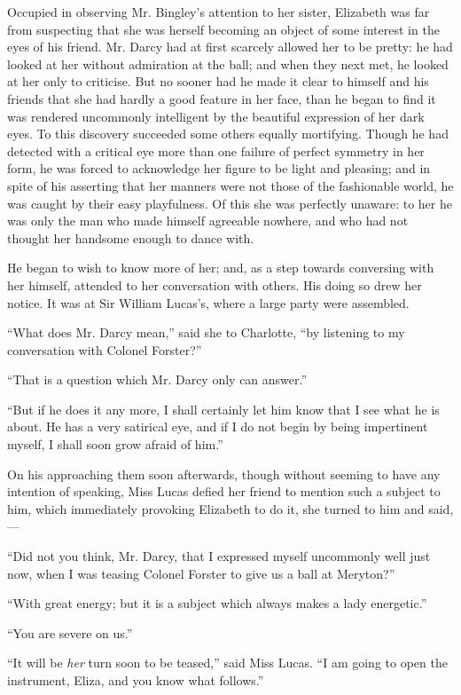 Occupied in observing Mr. Bingley's attention to her sister, Elizabeth was far from suspecting that she was herself becoming an object of some interest in the eyes of his friend. Mr. Darcy had at first scarcely allowed her to be pretty: he had looked at her without admiration at the ball; and when they next met, he looked at her only to criticise. But no sooner had he made it clear to himself and his friends that she had hardly a good feature in her face, than he began to find it was rendered uncommonly intelligent by the beautiful expression of her dark eyes. To this discovery succeeded some others equally mortifying. Though he had detected with a critical eye more than one failure of perfect symmetry in her form, he was forced to acknowledge her figure to be light and pleasing; and in spite of his asserting that her manners were not those of the fashionable world, he was caught by their easy playfulness. Of this she was perfectly unaware: to her he was only the man who made himself agreeable nowhere, and who had not thought her handsome enough to dance with.

He began to wish to know more of her; and, as a step towards conversing with her himself, attended to her conversation with others. His doing so drew her notice. It was at Sir William Lucas's, where a large party were assembled.

``What does Mr. Darcy mean,'' said she to Charlotte, ``by listening to my conversation with Colonel Forster?''

``That is a question which Mr. Darcy only can answer.''

``But if he does it any more, I shall certainly let him know that I see what he is about. He has a very satirical eye, and if I do not begin by being impertinent myself, I shall soon grow afraid of him.''

On his approaching them soon afterwards, though without seeming to have any intention of speaking, Miss Lucas defied her friend to mention such a subject to him, which immediately provoking Elizabeth to do it, she turned to him and said,---

``Did not you think, Mr. Darcy, that I expressed myself uncommonly well just now, when I was teasing Colonel Forster to give us a ball at Meryton?''

``With great energy; but it is a subject which always makes a lady energetic.''

``You are severe on us.''

``It will be \textit{her} turn soon to be teased,'' said Miss Lucas. ``I am going to open the instrument, Eliza, and you know what follows.''

